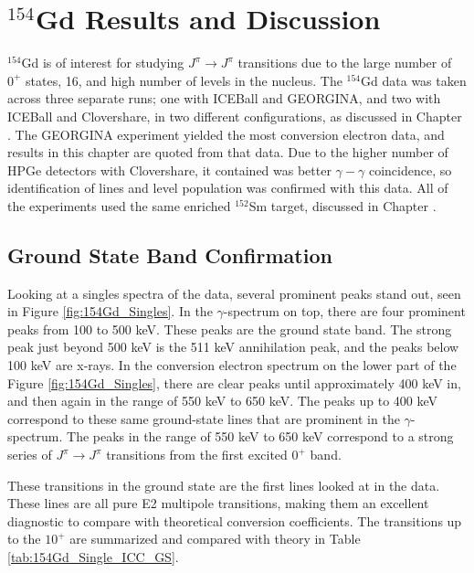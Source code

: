\chapter{$^{154}$Gd Results and Discussion}
\label{chap:154Gd}

$^{154}$Gd is of interest for studying $J^\pi\rightarrow J^\pi$ transitions due to the large number of $0^+$ states, 16, and high number of levels in the nucleus. The $^{154}$Gd data was taken across three separate runs; one with ICEBall and GEORGINA, and two with ICEBall and Clovershare, in two different configurations, as discussed in Chapter \label{chap:setup}. The GEORGINA experiment yielded the most conversion electron data, and results in this chapter are quoted from that data. Due to the higher number of HPGe detectors with Clovershare, it contained was better $\gamma-\gamma$ coincidence, so identification of lines and level population was confirmed with this data. All of the experiments used the same enriched $^{152}$Sm target, discussed in Chapter \label{chap:setup}.

\section{Ground State Band Confirmation}
\label{sec:154GS_Confirm}

Looking at a singles spectra of the data, several prominent peaks stand out, seen in Figure \ref{fig:154Gd_Singles}. In the $\gamma$-spectrum on top, there are four prominent peaks from 100 to 500 keV. These peaks are the ground state band. The strong peak just beyond 500 keV is the 511 keV annihilation peak, and the peaks below 100 keV are x-rays. In the conversion electron spectrum on the lower part of the Figure \ref{fig:154Gd_Singles}, there are clear peaks until approximately 400 keV in, and then again in the range of 550 keV to 650 keV. The peaks up to 400 keV correspond to these same ground-state lines that are prominent in the $\gamma$-spectrum. The peaks in the range of 550 keV to 650 keV correspond to a strong series of $J^{\pi}\rightarrow J^{\pi}$ transitions from the first excited $0^+$ band.



These transitions in the ground state are the first lines looked at in the data. These lines are all pure E2 multipole transitions, making them an excellent diagnostic to compare with theoretical conversion coefficients. The transitions up to the $10^+$ are summarized and compared with theory in Table \ref{tab:154Gd_Single_ICC_GS}.

